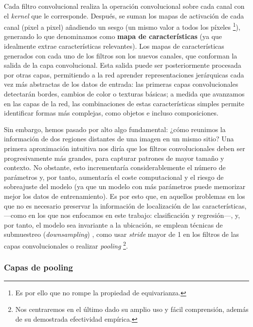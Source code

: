 Cada filtro convolucional realiza la operación convolucional sobre cada canal con el \textit{kernel} que le 
corresponde. Después, se suman los mapas de activación de cada canal (pixel a pixel) añadiendo un sesgo 
(un mismo valor a todos los píxeles
\footnote{
    Es por ello que no rompe la propiedad de equivarianza.
}),
generando lo que denominamos como \textbf{mapa de características} (ya que idealmente extrae 
características relevantes). Los mapas de características generados con cada uno de los filtros son los nuevos 
canales, que conforman la salida de la capa convolucional. Esta salida puede ser posteriormente procesada por 
otras capas, permitiendo a la red aprender representaciones jerárquicas cada vez más abstractas de los datos 
de entrada: las primeras capas convolucionales detectarán bordes, cambios de color o texturas básicas; a 
medida que avanzamos en las capas de la red, las combinaciones de estas características simples permite 
identificar formas más complejas, como objetos e incluso composiciones.

Sin embargo, hemos pasado por alto algo fundamental: ¿cómo reunimos la información de dos regiones distantes 
de una imagen en un mismo sitio? Una primera aproximación intuitiva nos diría que los filtros convolucionales 
deben ser progresivamente más grandes, para capturar patrones de mayor tamaño y contexto. No obstante, esto
incrementaría considerablemente el número de parámetros y, por tanto, aumentaría el coste computacional y 
el riesgo de sobreajuste del modelo (ya que un modelo con más parámetros puede memorizar mejor los
datos de entrenamiento). Es por esto que, en aquellos problemas en los que no es necesario preservar la 
información de localización de las características, ---como en los que nos enfocamos en este trabajo: 
clasificación y regresión---, y, por tanto, el modelo sea invariante a la ubicación, se emplean técnicas de 
submuestreo (\textit{downsampling}) \cite{murphy2022}, como usar \textit{stride} mayor de 1 en los filtros
de las capas convolucionales o realizar \textit{pooling}
\footnote{
    Nos centraremos en el último dado su amplio uso y fácil comprensión, además de su demostrada efectividad 
    empírica.
}.



\subsubsection{Capas de pooling}


